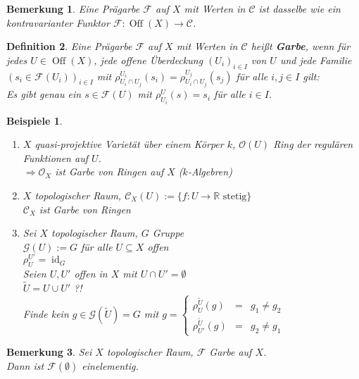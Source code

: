 \documentclass[paper = A4, fontsize=12pt, numbers=noendperiod, chapterprefix=true]{scrbook}
\theoremstyle{break}
\newtheorem{Def}{Definition}[section]
\newtheorem{Bem}[Def]{Bemerkung}
\theoremstyle{nonumberbreak}
\newtheorem{bspe}{Beispiele}
\theoremstyle{nonumberplain}
\newcommand{\emp}[1]{\textbf{\emph{#1}}}
\newcommand{\defterm}[1]{{\index{#1}}\emp{#1}}
\DeclareMathOperator{\Off}{Off}
\DeclareMathOperator{\id}{id}
\newcommand{\R}{\mathbb{R}}
\begin{document}
\begin{Bem}
Eine Pr\"agarbe $\mathcal F$ auf $X$ mit Werten in $\mathcal C$ ist dasselbe wie ein kontravarianter Funktor $\mathcal F: \Off(X) \to \mathcal C$.
\end{Bem}

\begin{Def}\label{1.3}
Eine Pr\"agarbe $\mathcal F$ auf $X$ mit Werten in $\mathcal C$ hei\ss t \defterm{Garbe}, wenn f\"ur jedes $U\in \Off(X)$, jede offene \"Uberdeckung $(U_i)_{i\in I}$ von $U$ und jede Familie $(s_i \in \mathcal F(U_i))_{i \in I}$ mit $\rho_{U_i\cap U_j}^{U_i}(s_i) = \rho_{U_i\cap U_j}^{U_j}(s_j)$ f\"ur alle $i,j \in I$ gilt:\\
Es gibt \emph{genau ein} $s \in \mathcal F(U)$ mit $\rho_{U_i}^U(s) = s_i$ f\"ur alle $i \in I$.
\end{Def}

\begin{bspe}\label{bsp1.3}\begin{enumerate}[1)]
\item
  $X$ quasi-projektive Variet\"at \"uber einem K\"orper $k$, $\mathcal O(U)$ Ring der regul\"aren Funktionen auf $U$.\\
  $\Rightarrow \mathcal O_X$ ist Garbe von Ringen auf $X$ ($k$-Algebren)
\item
  $X$ topologischer Raum, $\mathcal C_X(U) := \{f: U\to \R \text{ stetig}\}$\\
  $\mathcal C_X$ ist Garbe von Ringen
\item\label{bsp1.3.3}
  Sei $X$ topologischer Raum, $G$ Gruppe\\
  $\mathcal G(U) := G$ f\"ur alle $U \subseteq X$ offen\\
  $\rho_U^{U'} = \id_G$\\
  Seien $U, U'$ offen in $X$ mit $U\cap U' = \emptyset$\\
  $\widetilde U = U \cup U'$ ?!\\
  Finde kein $g\in \mathcal G(\widetilde U) = G$ mit $g = \left\{\begin{array}{rcl} \rho_{U}^{\widetilde U}(g) &=& g_1 \ne g_2 \\ \rho_{U'}^{\widetilde U}(g) &=& g_2 \ne g_1 \end{array}\right.$
\end{enumerate}\end{bspe}

\begin{Bem}
Sei $X$ topologischer Raum, $\mathcal F$ Garbe auf $X$.\\
Dann ist $\mathcal F(\emptyset)$ einelementig.
\end{Bem}
\end{document}
